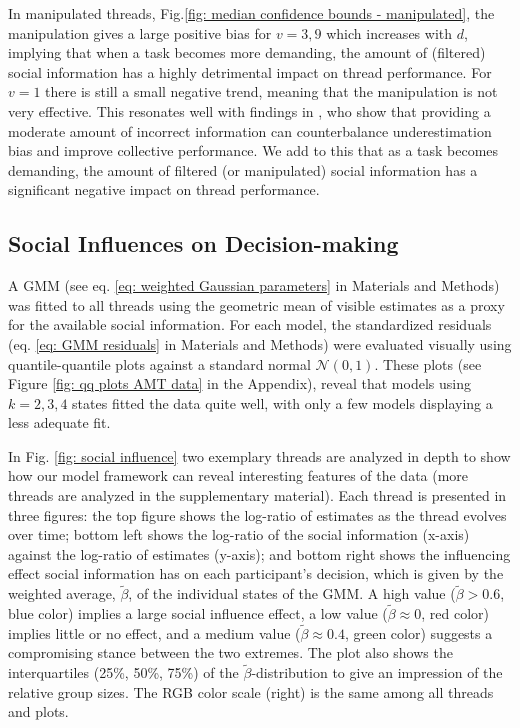 \documentclass[9pt,twocolumn,twoside,lineno]{pnas-new}
\begin{document}
In manipulated threads, Fig.\ref{fig: median confidence bounds - manipulated}, the manipulation gives a large positive bias for $v=3,9$ which increases with $d$, implying that when a task becomes more demanding, the amount of (filtered) social information has a highly detrimental impact on thread performance. For $v=1$ there is still a small negative trend, meaning that the manipulation is not very effective. This resonates well with findings in \cite{jayles2017social}, who show that providing a moderate amount of incorrect information can counterbalance underestimation bias and improve collective performance. We add to this that as a task becomes demanding, the amount of filtered (or manipulated) social information has a significant negative impact on thread performance. %

\subsection*{Social Influences on Decision-making} 
A GMM (see eq. \ref{eq: weighted Gaussian parameters} in Materials and Methods) was fitted to all threads using the geometric mean of visible estimates as a proxy for the available social information. For each model, the standardized residuals (eq. \ref{eq: GMM residuals} in Materials and Methods) were evaluated visually using quantile-quantile plots against a standard normal $\mathcal{N}(0,1)$. These plots (see Figure \ref{fig: qq plots AMT data} in the Appendix), reveal that models using $k=2,3,4$ states fitted the data quite well, with only a few models displaying a less adequate fit. 


In Fig. \ref{fig: social influence} two exemplary threads are analyzed in depth to show how our model framework can reveal interesting features of the data (more threads are analyzed in the supplementary material). Each thread is presented in three figures: the top figure shows the log-ratio of estimates as the thread evolves over time; bottom left shows the log-ratio of the social information (x-axis) against the log-ratio of estimates (y-axis); and bottom right shows the influencing effect social information has on each participant's decision, which is given by the weighted average, $\tilde{\beta}$, of the individual states of the GMM. A high value ($\tilde{\beta}>0.6$, blue color) implies a large social influence effect, a low value ($\tilde{\beta}\approx 0$, red color) implies little or no effect, and a medium value ($\tilde{\beta} \approx 0.4$, green color) suggests a compromising stance between the two extremes. The plot also shows the interquartiles (25\%, 50\%, 75\%) of the $\tilde{\beta}$-distribution to give an impression of the relative group sizes. The RGB color scale (right) is the same among all threads and plots. 
\end{document}
